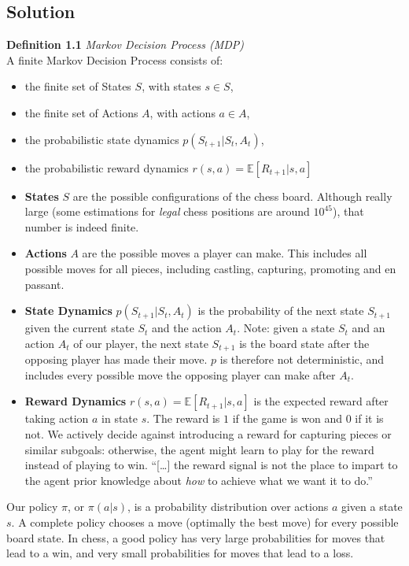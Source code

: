 \documentclass{article}
\begin{document}
\subsection{Solution}
\begin{tcolorbox}[colback=LightGray]
    \textbf{Definition 1.1} \textit{Markov Decision Process (MDP)} \\
    A finite Markov Decision Process consists of:
    \begin{itemize}
        \item the finite set of States $S$, with states $s \in S$,
        \item the finite set of Actions $A$, with actions $a \in A$,
        \item the probabilistic state dynamics $p(S_{t+1} | S_t, A_t)$,
        \item the probabilistic reward dynamics $r(s, a) = \mathbb{E}[R_{t+1} | s, a]$
    \end{itemize}
\end{tcolorbox}
\begin{itemize}
    \item \textbf{States} $S$ are the possible configurations of the chess board.
    Although really large (some estimations for \emph{legal} chess positions are around $10^{45}$),
    that number is indeed finite.
    \item \textbf{Actions} $A$ are the possible moves a player can make. This includes
    all possible moves for all pieces, including castling, capturing, promoting and en passant.
    \item \textbf{State Dynamics} $p(S_{t+1} | S_t, A_t)$ is the probability of the next state
    $S_{t+1}$ given the current state $S_t$ and the action $A_t$. Note: given a 
    state $S_t$ and an action $A_t$ of our player, the next state $S_{t+1}$ is the board state
    after the opposing player has made their move. $p$ is therefore not deterministic, and includes
    every possible move the opposing player can make after $A_t$.
    \item \textbf{Reward Dynamics} $r(s, a) = \mathbb{E}[R_{t+1} | s, a]$ is the expected reward
    after taking action $a$ in state $s$. The reward is $1$ if the game is won and $0$ if it is not. 
    We actively decide against introducing a reward for capturing pieces or similar subgoals: otherwise, 
    the agent might learn to play for the reward instead of playing to win. ``[\dots] the reward signal is 
    not the place to impart to the agent prior knowledge about \emph{how} to achieve what we want it to do.''\cite{sutton_bach_barto_2018}
\end{itemize}
Our policy $\pi$, or $\pi(a|s)$, is a probability distribution over actions $a$ given a state $s$.
A complete policy chooses a move (optimally the best move) for every possible board state.
In chess, a good policy has very large probabilities for moves that lead to a win, and very small
probabilities for moves that lead to a loss. 
\end{document}
